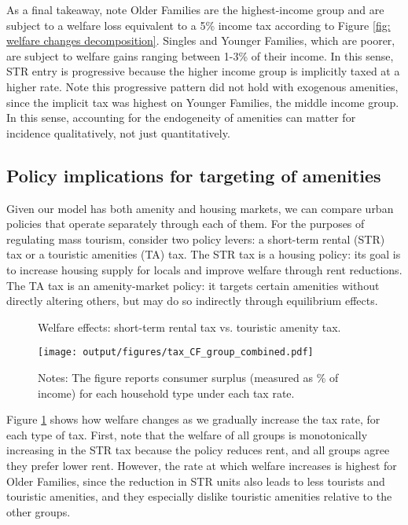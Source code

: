 \documentclass[11pt]{article}
\begin{document}
As a final takeaway, note Older Families are the highest-income group and are subject to a welfare loss equivalent to a 5\% income tax according to Figure \ref{fig: welfare changes decomposition}. Singles and Younger Families, which are poorer, are subject to welfare gains ranging between 1-3\% of their income. In this sense, STR entry is progressive because the higher income group is implicitly taxed at a higher rate. Note this progressive pattern did not hold with exogenous amenities, since the implicit tax was highest on Younger Families, the middle income group.  In this sense, accounting for the endogeneity of amenities can matter for incidence qualitatively, not just quantitatively.


\subsection{Policy implications for targeting of amenities}\label{sec: counterfactuals - tax and zoning}

Given our model has both amenity and housing markets, we can compare urban policies that operate separately through each of them. For the purposes of regulating mass tourism, consider two policy levers: a short-term rental (STR) tax or a touristic amenities (TA) tax. The STR tax is a housing policy: its goal is to increase housing supply for locals and improve welfare through rent reductions. The TA tax is an amenity-market policy: it targets certain amenities without directly altering others, but may do so indirectly through equilibrium effects.

\begin{figure}[ht]
    \centering
    \caption{Welfare effects: short-term rental tax vs. touristic amenity tax.}\label{fig: counterfactual taxes}
    \texttt{[image: output/figures/tax\_CF\_group\_combined.pdf]}
    \caption*{\footnotesize Notes: The figure reports consumer surplus (measured as \% of income) for each household type under each tax rate.}
\end{figure}

Figure \ref{fig: counterfactual taxes} shows how welfare changes as we gradually increase the tax rate, for each type of tax. First, note that the welfare of all groups is monotonically increasing in the STR tax because the policy reduces rent, and all groups agree they prefer lower rent. However, the rate at which welfare increases is highest for Older Families, since the reduction in STR units also leads to less tourists and touristic amenities, and they especially dislike touristic amenities relative to the other groups.
\end{document}
